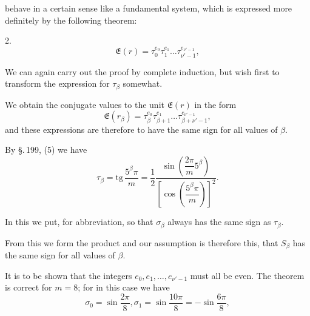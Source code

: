 behave in a certain sense like a fundamental system, which is expressed
more definitely by the following theorem:

2. 
\[
\mathfrak{E}(r) = \tau_0^{e_0}\tau_1^{e_1}\ldots\tau_{\nu'-1}^{e_{\nu'-1}},
\]

We can again carry out the proof by complete induction, but wish first
to transform the expression for $\tau_\beta$ somewhat.

We obtain the conjugate values to the unit $\mathfrak{E}(r)$
in the form
\[
\mathfrak{E}(r_\beta) = \tau_\beta^{e_0}\tau_{\beta+1}^{e_1}\ldots\tau_{\beta+\nu'-1}^{e_{\nu'-1}},
\]
and these expressions are therefore to have the same sign for all
values of $\beta$.

By §.\,199, (5) we have
\[
\tau_\beta = \mathrm{tg}\,\frac{5^\beta\pi}{m} = \frac{1}{2}\frac{\sin\left(\dfrac{2\pi}{m}5^\beta\right)}{\left[\cos\left(\dfrac{5^\beta\pi}{m}\right)\right]^2}.
\]

In this we put, for abbreviation,
so that $\sigma_\beta$ always has the same sign as $\tau_\beta$.

From this we form the product
and our assumption is therefore this, that $S_\beta$ has the same sign
for all values of $\beta$.

It is to be shown that the integers
$e_0, e_1, \ldots, e_{\nu'-1}$ must all be even. The theorem is
correct for $m=8$; for in this case we have
\[
\sigma_0 = \sin\frac{2\pi}{8}, \sigma_1 = \sin\frac{10\pi}{8} = -\sin\frac{6\pi}{8},
\]
